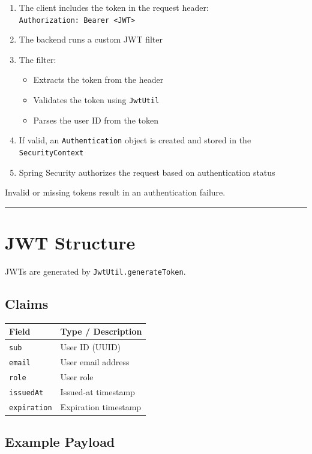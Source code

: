 \documentclass[a4paper,11pt]{article}
\begin{document}
\begin{enumerate}
  \item The client includes the token in the request header:\\
        \texttt{Authorization: Bearer <JWT>}
  \item The backend runs a custom JWT filter
  \item The filter:
    \begin{itemize}
      \item Extracts the token from the header
      \item Validates the token using \texttt{JwtUtil}
      \item Parses the user ID from the token
    \end{itemize}
  \item If valid, an \texttt{Authentication} object is created and stored in the \texttt{SecurityContext}
  \item Spring Security authorizes the request based on authentication status
\end{enumerate}

Invalid or missing tokens result in an authentication failure.

\hrule
\vspace{1em}

\section{JWT Structure}

JWTs are generated by \texttt{JwtUtil.generateToken}.

\subsection*{Claims}

\begin{longtable}{|p{4cm}|p{8cm}|}
\hline
\textbf{Field} & \textbf{Type / Description} \\
\hline
\texttt{sub} & User ID (UUID) \\
\texttt{email} & User email address \\
\texttt{role} & User role \\
\texttt{issuedAt} & Issued-at timestamp \\
\texttt{expiration} & Expiration timestamp \\
\hline
\end{longtable}

\subsection*{Example Payload}
\end{document}
